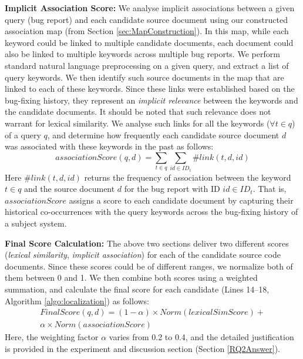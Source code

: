 \documentclass[conference]{IEEEtran}
\begin{document}
\textbf{Implicit Association Score:} We analyse implicit associations between a given query (bug report) and each candidate source document using our constructed association map (from Section \ref{sec:MapConstruction}). In this map, while each keyword could be linked to multiple candidate documents, each document could also be linked to multiple keywords across multiple bug reports. 
We perform standard natural language preprocessing on a given query, and extract a list of query keywords.
We then identify such source documents in the map that are linked to each of these keywords. Since these links were established based on the bug-fixing history, they represent an \emph{implicit relevance} between the keywords and the candidate documents. It should be noted that such relevance does not warrant for lexical similarity.
We analyse such links for all the keywords ($\forall t\in q$) of a query $q$, and determine how frequently each candidate source document $d$ was associated with these keywords in the past as follows: 
\begin{equation*}\label{CoOccequation}
associationScore(q,d)=\sum_{t\in q}\sum_{id\in ID_t} \#link(t,d,id)
\end{equation*}
Here $\#link(t,d,id)$ returns the frequency of association between the keyword $t\in q$ and the source document $d$ for the bug report with ID $id\in ID_t$.   
That is, $associationScore$ assigns a score to each candidate document by capturing their historical co-occurrences with the query keywords across the bug-fixing history of a subject system.





\textbf{Final Score Calculation:} The above two sections deliver two different scores (\emph{lexical similarity}, \emph{implicit association}) for each of the candidate source code documents. Since these scores could be of different ranges, we normalize both of them between 0 and 1. We then
combine both scores using a weighted summation, and calculate the final score for each candidate (Lines 14--18, Algorithm \ref{algo:localization}) as follows:
\begin{multline*}\label{equationVSMme}
FinalScore(q,d)=(1-\alpha )\times Norm(lexicalSimScore)+ \\
\alpha \times Norm(associationScore)
\end{multline*}
Here, the weighting factor $\alpha$ varies from 0.2 to 0.4, and
the detailed justification is provided in the experiment and discussion section (Section \ref{RQ2Answer}). 
\end{document}
